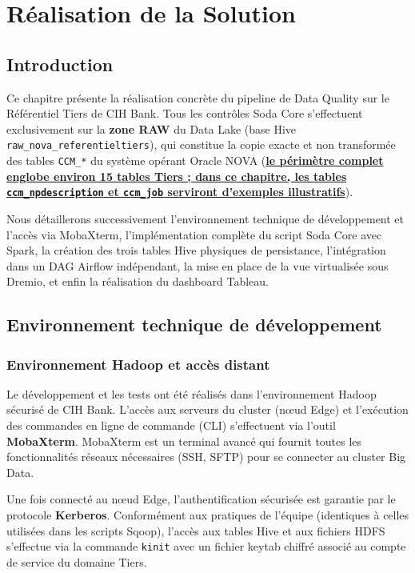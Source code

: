 \chapter{Réalisation de la Solution}

\section*{Introduction}
Ce chapitre présente la réalisation concrète du pipeline de Data Quality sur le Référentiel Tiers de CIH Bank. Tous les contrôles Soda Core s'effectuent exclusivement sur la \textbf{zone RAW} du Data Lake (base Hive \texttt{raw\_nova\_referentieltiers}), qui constitue la copie exacte et non transformée des tables \texttt{CCM\_*} du système opérant Oracle NOVA (\textbf{\uline{le périmètre complet englobe environ 15 tables Tiers ; dans ce chapitre, les tables \texttt{ccm\_npdescription} et \texttt{ccm\_job} serviront d'exemples illustratifs}}). 

Nous détaillerons successivement l'environnement technique de développement et l'accès via MobaXterm, l'implémentation complète du script Soda Core avec Spark, la création des trois tables Hive physiques de persistance, l'intégration dans un DAG Airflow indépendant, la mise en place de la vue virtualisée sous Dremio, et enfin la réalisation du dashboard Tableau.

\section{Environnement technique de développement}

\subsection{Environnement Hadoop et accès distant}

Le développement et les tests ont été réalisés dans l'environnement Hadoop sécurisé de CIH Bank. L'accès aux serveurs du cluster (nœud Edge) et l'exécution des commandes en ligne de commande (CLI) s'effectuent via l'outil \textbf{MobaXterm}. MobaXterm est un terminal avancé qui fournit toutes les fonctionnalités réseaux nécessaires (SSH, SFTP) pour se connecter au cluster Big Data. 

Une fois connecté au nœud Edge, l'authentification sécurisée est garantie par le protocole \textbf{Kerberos}. Conformément aux pratiques de l'équipe (identiques à celles utilisées dans les scripts Sqoop), l'accès aux tables Hive et aux fichiers HDFS s'effectue via la commande \texttt{kinit} avec un fichier keytab chiffré associé au compte de service du domaine Tiers.

